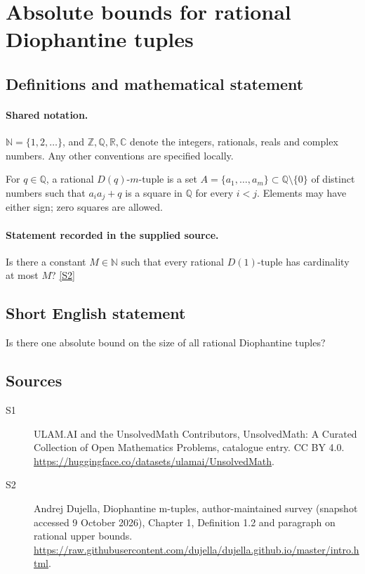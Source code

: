\documentclass[11pt]{article}
\newcommand{\sref}[2]{\hyperlink{source:#1:#2}{[S#2]}}
\begin{document}
\section{Absolute bounds for rational Diophantine tuples}\label{statement}

\subsection{Definitions and mathematical statement}

\paragraph{Shared notation.}$\mathbb N=\{1,2,\ldots\}$, and $\mathbb Z,\mathbb Q,\mathbb R,\mathbb C$ denote the integers, rationals, reals and complex numbers. Any other conventions are specified locally.


For $q\in\mathbb Q$, a rational $D(q)$-$m$-tuple is a set $A=\{a_1,\ldots,a_m\}\subset\mathbb Q\setminus\{0\}$ of distinct numbers such that $a_i a_j+q$ is a square in $\mathbb Q$ for every $i<j$. Elements may have either sign; zero squares are allowed.
\paragraph{Statement recorded in the supplied source.}
Is there a constant $M\in\mathbb N$ such that every rational $D(1)$-tuple has cardinality at most $M$? \sref{statement}{2}
\subsection{Short English statement}
Is there one absolute bound on the size of all rational Diophantine tuples?
\subsection{Sources}
\begin{description}
\item[\hypertarget{source:statement:1}{S1}] ULAM.AI and the UnsolvedMath Contributors, UnsolvedMath: A Curated Collection of Open Mathematics Problems, catalogue entry. CC BY 4.0. \url{https://huggingface.co/datasets/ulamai/UnsolvedMath}.
\item[\hypertarget{source:statement:2}{S2}] Andrej Dujella, Diophantine m-tuples, author-maintained survey (snapshot accessed 9 October 2026), Chapter 1, Definition 1.2 and paragraph on rational upper bounds. \url{https://raw.githubusercontent.com/dujella/dujella.github.io/master/intro.html}.
\end{description}
\label{end:statement}
\end{document}
